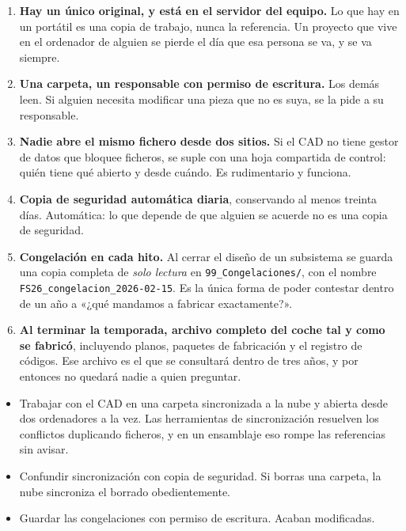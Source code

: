 \begin{enumerate}
  \item \textbf{Hay un único original, y está en el servidor del equipo.} Lo que
        hay en un portátil es una copia de trabajo, nunca la referencia. Un
        proyecto que vive en el ordenador de alguien se pierde el día que esa
        persona se va, y se va siempre.
  \item \textbf{Una carpeta, un responsable con permiso de escritura.} Los demás
        leen. Si alguien necesita modificar una pieza que no es suya, se la pide
        a su responsable.
  \item \textbf{Nadie abre el mismo fichero desde dos sitios.} Si el CAD no tiene
        gestor de datos que bloquee ficheros, se suple con una hoja compartida de
        control: quién tiene qué abierto y desde cuándo. Es rudimentario y funciona.
  \item \textbf{Copia de seguridad automática diaria}, conservando al menos
        treinta días. Automática: lo que depende de que alguien se acuerde no es
        una copia de seguridad.
  \item \textbf{Congelación en cada hito.} Al cerrar el diseño de un subsistema se
        guarda una copia completa de \emph{solo lectura} en
        \texttt{99\_Congelaciones/}, con el nombre
        \texttt{FS26\_congelacion\_2026-02-15}. Es la única forma de poder
        contestar dentro de un año a «¿qué mandamos a fabricar exactamente?».
  \item \textbf{Al terminar la temporada, archivo completo del coche tal y como
        se fabricó}, incluyendo planos, paquetes de fabricación y el registro de
        códigos. Ese archivo es el que se consultará dentro de tres años, y por
        entonces no quedará nadie a quien preguntar.
\end{enumerate}

\begin{ojo}
\begin{itemize}
  \item Trabajar con el CAD en una carpeta sincronizada a la nube y abierta desde
        dos ordenadores a la vez. Las herramientas de sincronización resuelven los
        conflictos duplicando ficheros, y en un ensamblaje eso rompe las
        referencias sin avisar.
  \item Confundir sincronización con copia de seguridad. Si borras una carpeta,
        la nube sincroniza el borrado obedientemente.
  \item Guardar las congelaciones con permiso de escritura. Acaban modificadas.
\end{itemize}
\end{ojo}

